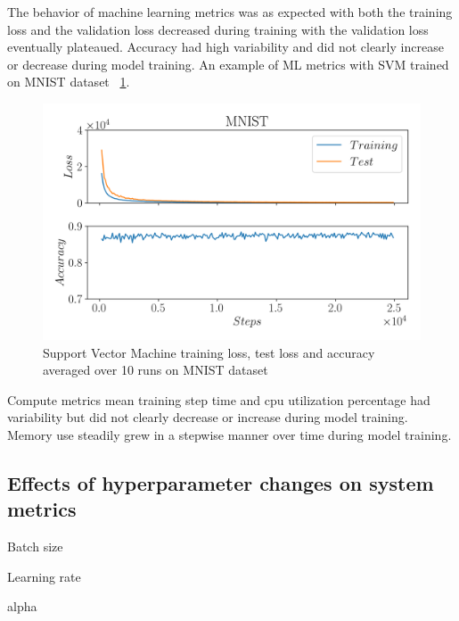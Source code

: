 The behavior of machine learning metrics was as expected with both the training loss and the validation loss decreased during training with the validation loss eventually plateaued. Accuracy had high variability and did not clearly increase or decrease during model training. An example of ML metrics with SVM trained on MNIST dataset ~\ref{figure:mlmetrics}. 

\begin{figure}[h]
    \includegraphics[width=12cm]{assets/ml_metrics.png}
    \caption{Support Vector Machine training loss, test loss and accuracy averaged over 10 runs on MNIST dataset}
    \label{figure:mlmetrics}
\end{figure}

Compute metrics mean training step time and cpu utilization percentage had variability but did not clearly decrease or increase during model training.  Memory use steadily grew in a stepwise manner over time during model training.  


\subsection{Effects of hyperparameter changes on system metrics}

Batch size

Learning rate

alpha


